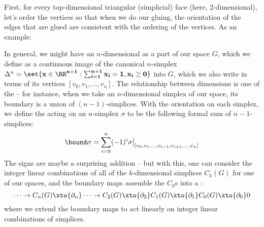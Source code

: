 \documentclass[12pt]{article}
\begin{document}
  First, for every top-dimensional triangular (simplicial) face (here,
  2-dimensional), let's order the vertices so that when we do our gluing, the
  orientation of the edges that are glued are consistent with the ordering of the
  vertices. As an example:
    \begin{center}
 
    \end{center}
  In general, we might have an $n$-dimensional  as a part of our
  space $G$, which we define as a continuous image of the canonical $n$-simplex
  $\Delta^n = \set{\bf x \in \RR^{n+1} : \sum_{i=1}^{n+1} x_i = 1, x_i \geq
  0}$ into $G$, which we also write in terms of its vertices $[v_0, v_1,
  \dots, v_n]$. The relationship between dimensions is one of the
   -- for instance, when we take an $n$-dimensional simplex of our
  space, its boundary is a union of $(n-1)$-simplices. With the orientation on each
  simplex, we define the  acting on an $n$-simplex $\sigma$ to be the
  following formal sum of $n-1$-simplices:
  \[
  \bound \sigma = \sum_{i=0}^n (-1)^i \sigma\big|_{[v_0, v_1, \dots, v_{i-1},
  v_{i+1}, \dots, v_n]}
  \]
  The signs are maybe a surprising addition -- but with this, one can consider the
  integer linear combinations of all of the $k$-dimensional simplices $C_k(G)$ for
  one of our spaces, and the boundary maps assemble the $C_k$s into a :
  \[
    \dots \to C_n(G) \xto {\partial_n} \dots \to C_2(G) \xto{\partial_2} C_1(G)
    \xto{\partial_1} C_0(G) \xto{\partial_0} 0
  \]
  where we extend the boundary maps to act linearly on integer linear combinations
  of simplices.
 
\end{document}
